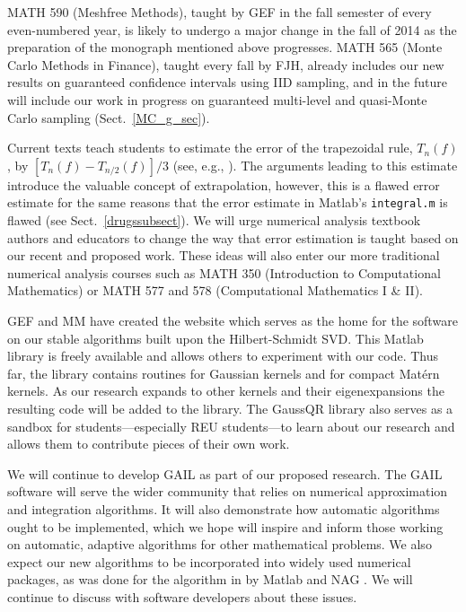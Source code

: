 \documentclass[11pt]{NSFamsart}
\newcommand{\Matlab}{{\sc Matlab}\xspace}
\begin{document}
\begin{description}[leftmargin=2.5ex]
\item[Refreshing Course Syllabi]
MATH 590 (Meshfree Methods), taught by GEF in the fall semester of every even-numbered year, is likely to undergo a major change in the fall of 2014 as the preparation of the monograph mentioned above progresses. MATH 565 (Monte Carlo Methods in Finance), taught every fall by FJH, already includes our new results on guaranteed confidence intervals using IID sampling, and in the future will include our work in progress on guaranteed multi-level and quasi-Monte Carlo sampling (Sect.\ \ref{MC_g_sec}).

\item[Changing How Numerical Analysis Is Taught] Current texts teach students to estimate the error of the trapezoidal rule, $T_n(f)$, by $[T_n(f)-T_{n/2}(f)]/3$ (see, e.g., \cite[p.\ 223--224]{BurFai10}).  The arguments leading to this estimate introduce the valuable concept of extrapolation, however, this is a flawed error estimate for the same reasons that the error estimate in \Matlab's {\tt integral.m} is flawed (see Sect.\ \ref{drugssubsect}).  We will urge numerical analysis textbook authors and educators to change the way that error estimation is taught based on our recent and proposed work.  These ideas will also enter our more traditional numerical analysis courses such as MATH 350 (Introduction to Computational Mathematics) or MATH 577 and 578 (Computational Mathematics I \& II).

\item[Creating Software and Collaborating with Software Developers]
GEF and MM have created the website \citep{McCFBG13} which serves as the home for the software on our stable algorithms built upon the Hilbert-Schmidt SVD. This \Matlab library is freely available and allows others to experiment with our code. Thus far, the library contains routines for Gaussian kernels and for compact Mat\'ern kernels. As our research expands to other kernels and their eigenexpansions the resulting code will be added to the library. The GaussQR library also serves as a sandbox for students---especially REU students---to learn about our research and allows them to contribute pieces of their own work.

We will continue to develop GAIL \citep{ChoEtal14a} as part of our proposed research.  The GAIL software will serve the wider community that relies on numerical approximation and integration algorithms.  It will also demonstrate how automatic algorithms ought to be implemented, which we hope will inspire and inform those working on automatic, adaptive algorithms for other mathematical problems.  We also expect our new algorithms to be incorporated into widely used numerical packages, as was done for the algorithm in \cite{HonHic00a} by \Matlab \citep{MAT8.2} and NAG \citep{NAG23}.  We will continue to discuss with software developers about these issues.


\end{description}
\end{document}
